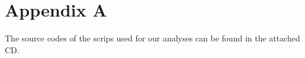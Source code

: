 \chapter*{Appendix A}

The source codes of the scrips used for our analyses can be found in the attached CD.